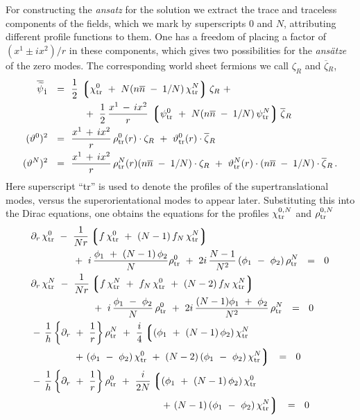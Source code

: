 \documentclass[12pt]{article}
\newcommand{\p}{\partial}
\newcommand{\wt}{\widetilde}
\newcommand{\ov}{\overline}
\newcommand{\lgr}{\left\lgroup}
\newcommand{\rgr}{\right\rgroup}
\newcommand{\bzr}{\ov{\zeta}{}_R}
\newcommand{\zr}{\zeta_R}
\newcommand{\nbar}{\ov{n}}
\newcommand{\pts}{\psi_{\rm tr}^0}
\newcommand{\ptN}{\psi_{\rm tr}^N}
\newcommand{\cts}{\chi_{\rm tr}^0}
\newcommand{\ctN}{\chi_{\rm tr}^N}
\newcommand{\tts}{\vartheta_{\rm tr}^0}
\newcommand{\ttN}{\vartheta_{\rm tr}^N}
\newcommand{\rts}{\rho_{\rm tr}^0}
\newcommand{\rtN}{\rho_{\rm tr}^N}
\begin{document}
For constructing the {\it ansatz} for the solution we extract the trace and traceless components of the
fields, which we mark by superscripts $0$ and $N$, attributing different profile functions to them. 
One has a freedom of placing a factor of $ (x^1 \pm ix^2)/r $ in these components, which gives two possibilities
for the {\it ans\"atze} of the zero modes.
The corresponding world sheet fermions we call $ \zr $ and $ \bzr $,
\begin{align*}
%
	\ov{\wt{\psi}}{}_{\dot 1} ~~=~~ & \frac{1}{2}\, \lgr \cts ~+~ N (n\nbar \;-\; 1/N)\,\ctN \rgr \zr ~+~ \\
%
	& 
		\quad~+~
		\frac{1}{2}\, \frac{x^1 \,-\, ix^2}{r}\, \lgr \pts ~+~ N(n\nbar \;-\; 1/N)\, \ptN \rgr \bzr \\
%
	(\vartheta^0)^2 ~~=~~ &
		\frac{x^1 \,+\, ix^2}{r}\, \rts(r)\cdot \zr 
		~+~ \tts(r)\cdot \bzr \\
%
	(\vartheta^N)^2 ~~=~~ &
		\frac{x^1 \,+\, ix^2}{r}\,\rtN(r) (n\nbar \;-\; 1/N) \cdot \zr 
		~+~ \ttN(r)\cdot (n\nbar \;-\; 1/N) \cdot \bzr \,.
\end{align*}
Here superscript ``tr'' is used to denote the profiles of the supertranslational modes, versus the
superorientational modes to appear later.
Substituting this into the Dirac equations, one obtains the equations for the profiles 
$ \chi_{\rm tr}^{0,N} $ and $ \rho_{\rm tr}^{0,N} $
\begin{align*}
%
	&
	\p_r\, \cts ~-~ \frac{1}{Nr}\lgr f\,\cts ~+~ (N-1)\, f_N\, \ctN \rgr \\
	&
	\qquad\qquad
		~+~ i\, \frac{ \phi_1 ~+~ (N-1)\,\phi_2}{N} \rts 
		~+~ 2i\, \frac{N-1}{N^2}\, (\phi_1 ~-~ \phi_2)\, \rtN ~~=~~ 0
\\
%
	&
	\p_r\, \ctN ~-~ \frac{1}{Nr} \lgr f\, \ctN ~+~ f_N\, \cts ~+~ (N-2)\,f_N\,\ctN \rgr \\
	& 
	\qquad\qquad\qquad
		~+~ i\, \frac{\phi_1 ~-~ \phi_2}{N}\, \rts 
		~+~ 2i\, \frac{(N-1)\phi_1 ~+~ \phi_2}{N^2}\, \rtN ~~=~~ 0
\\
%
	&
	-\,\frac{1}{h} \left\{ \p_r ~+~ \frac{1}{r} \right\} \rtN 
		~+~ \frac{i}{4} \lgr (\phi_1 ~+~ (N-1)\,\phi_2)\,\ctN \right. \\
	&
	\qquad\qquad
		\left.
		~+~ (\phi_1~-~\phi_2)\,\cts ~+~ (N-2)\,(\phi_1~-~\phi_2)\,\ctN \rgr ~~=~~ 0
\\
%
	&
	-\,\frac{1}{h} \left\{ \p_r ~+~ \frac{1}{r} \right\} \rts 
		~+~ \frac{i}{2N} \lgr (\phi_1 ~+~ (N-1)\,\phi_2)\,\cts \right. \\
	&
	\qquad\qquad\qquad\qquad\qquad\qquad\quad
		\left.
		~+~ (N-1)\,(\phi_1~-~\phi_2)\,\ctN \rgr ~~=~~0
\end{align*}
\end{document}
